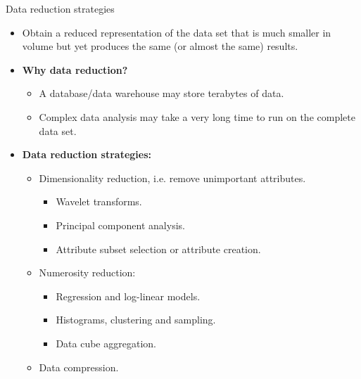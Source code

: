 \documentclass[aspectratio=169,t]{beamer}
\begin{document}
  { 
    \begin{frame}{Data reduction strategies}
        \begin{itemize}
            \item Obtain a reduced representation of the data set that is much smaller in volume but yet produces the same (or almost the same)  results.
            \item \textbf{Why data reduction?}\\
            \begin{itemize}
              \item A database/data warehouse may store terabytes of data.
              \item Complex data analysis may take a very long time to run on the complete data set.
            \end{itemize}
            \item \textbf{Data reduction strategies:}
            \begin{itemize}
              \item Dimensionality reduction, i.e. remove unimportant attributes.
              \begin{itemize}
                \item Wavelet transforms.
                \item Principal component analysis.
                \item Attribute subset selection or attribute creation.
              \end{itemize}
              \item Numerosity reduction:
              \begin{itemize}
                \item Regression and log-linear models.
                \item Histograms, clustering and sampling.
                \item Data cube aggregation.
              \end{itemize}
              \item Data compression.
            \end{itemize}
        \end{itemize}
    \end{frame}
  }
\end{document}

